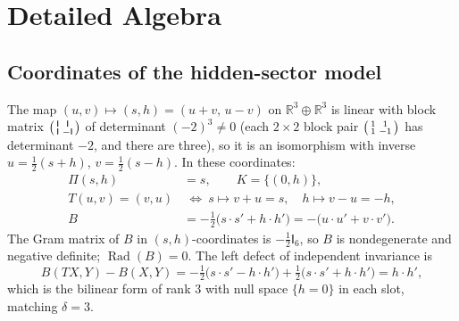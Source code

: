 \documentclass[11pt,a4paper]{article}
\newcommand{\RR}{\mathbb{R}}
\newcommand{\Rad}{\operatorname{Rad}}
\newcommand{\defic}{\delta}
\theoremstyle{plain}
\theoremstyle{definition}
\begin{document}
\appendix
\section{Detailed Algebra}\label{app:algebra}

\subsection{Coordinates of the hidden-sector model}
The map $(u,v)\mapsto(s,h)=(u+v,\,u-v)$ on $\RR^3\oplus\RR^3$ is linear with block matrix $\begin{psmallmatrix}\mathsf I&\mathsf I\\ \mathsf I&-\mathsf I\end{psmallmatrix}$ of determinant $(-2)^3\neq0$ (each $2\times2$ block pair $\begin{psmallmatrix}1&1\\1&-1\end{psmallmatrix}$ has determinant $-2$, and there are three), so it is an isomorphism with inverse $u=\tfrac12(s+h)$, $v=\tfrac12(s-h)$. In these coordinates:
\begin{align*}
\Pi(s,h)&=s,\qquad K=\{(0,h)\},\\
T(u,v)=(v,u)&\ \Longleftrightarrow\ s\mapsto v+u=s,\quad h\mapsto v-u=-h,\\
B&=-\tfrac12\bigl(s\!\cdot s'+h\!\cdot h'\bigr)=-\bigl(u\!\cdot u'+v\!\cdot v'\bigr).
\end{align*}
The Gram matrix of $B$ in $(s,h)$-coordinates is $-\tfrac12\mathsf I_6$, so $B$ is nondegenerate and negative definite; $\Rad(B)=0$.
The left defect of independent invariance is
\[ B(TX,Y)-B(X,Y)=-\tfrac12\bigl(s\!\cdot s'-h\!\cdot h'\bigr)+\tfrac12\bigl(s\!\cdot s'+h\!\cdot h'\bigr)=h\!\cdot h', \]
which is the bilinear form of rank $3$ with null space $\{h=0\}$ in each slot, matching $\defic=3$.
\end{document}
